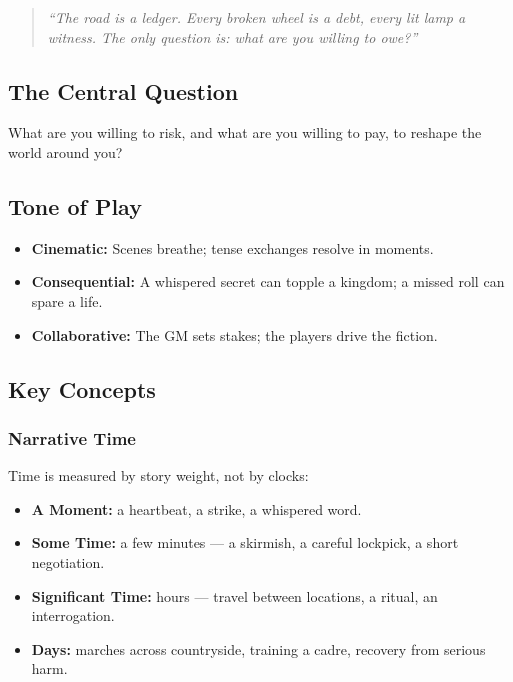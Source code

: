 \begin{quote}
\textit{``The road is a ledger. Every broken wheel is a debt, every lit lamp a witness. The only question is: what are you willing to owe?''}
\end{quote}

\subsection{The Central Question}

What are you willing to risk, and what are you willing to pay, to reshape the world around you?

\subsection{Tone of Play}

\begin{itemize}
  \item \textbf{Cinematic:} Scenes breathe; tense exchanges resolve in moments.
  \item \textbf{Consequential:} A whispered secret can topple a kingdom; a missed roll can spare a life.
  \item \textbf{Collaborative:} The GM sets stakes; the players drive the fiction.
\end{itemize}

\subsection{Key Concepts}

\subsubsection{Narrative Time}
Time is measured by story weight, not by clocks:

\begin{itemize}
  \item \textbf{A Moment:} a heartbeat, a strike, a whispered word.
  \item \textbf{Some Time:} a few minutes — a skirmish, a careful lockpick, a short negotiation.
  \item \textbf{Significant Time:} hours — travel between locations, a ritual, an interrogation.
  \item \textbf{Days:} marches across countryside, training a cadre, recovery from serious harm.
\end{itemize}


